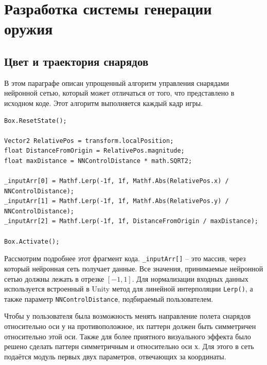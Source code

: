 ﻿%
\section{Разработка системы генерации оружия}

\subsection{Цвет и траектория снарядов}

В этом параграфе описан упрощенный алгоритм управления снарядами нейронной сетью, который может отличаться от того, что представлено в исходном коде. Этот алгоритм выполняется каждый кадр игры.


\begin{lstlisting}[name=Projectile, caption={Projectile. Part 1}]
Box.ResetState(); 

Vector2 RelativePos = transform.localPosition;
float DistanceFromOrigin = RelativePos.magnitude;
float maxDistance = NNControlDistance * math.SQRT2;

_inputArr[0] = Mathf.Lerp(-1f, 1f, Mathf.Abs(RelativePos.x) / NNControlDistance);
_inputArr[1] = Mathf.Lerp(-1f, 1f, Mathf.Abs(RelativePos.y) / NNControlDistance);
_inputArr[2] = Mathf.Lerp(-1f, 1f, DistanceFromOrigin / maxDistance);
            
Box.Activate();

\end{lstlisting}

Рассмотрим подробнее этот фрагмент кода. \lstinline{_inputArr[]} -- это массив, через который нейронная сеть получает данные. Все значения, принимаемые нейронной сетью должны лежать в отрезке $[-1,1]$. Для нормализации входных данных используется встроенный в Unity метод для линейной интерполяции \lstinline{Lerp()}, а также параметр \lstinline{NNControlDistance}, подбираемый пользователем.

Чтобы у пользователя была возможность менять направление полета снарядов относительно оси у на противоположное, их паттерн должен быть симметричен относительно этой оси. Также для более приятного визуального эффекта было решено сделать паттерн симметричным и относительно оси х. Для этого в сеть подаётся модуль первых двух параметров, отвечающих за координаты.

